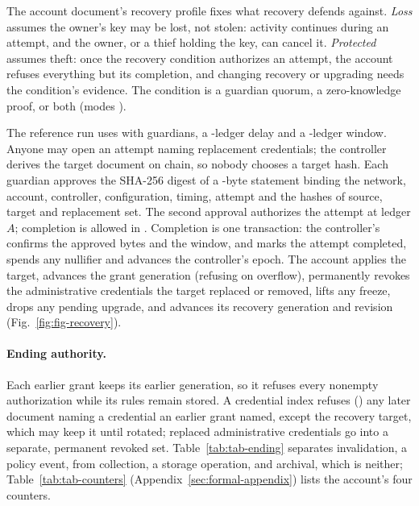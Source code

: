 The account document's recovery profile fixes what recovery defends against.
\emph{Loss} assumes the owner's key may be lost, not stolen: activity continues
during an attempt, and the owner, or a thief holding the key, can cancel it.
\emph{Protected} assumes theft: once the recovery condition authorizes an
attempt, the account refuses everything but its completion, and changing
recovery or upgrading needs the condition's evidence. The condition is
a guardian quorum, a zero-knowledge proof, or both (modes ).

The reference run uses  with
 guardians, a -ledger
delay and a -ledger window. Anyone may open an
attempt naming replacement credentials; the controller derives the target
document on chain, so nobody chooses a target hash. Each guardian approves the
SHA-256 digest of a -byte statement binding the
network, account, controller, configuration, timing, attempt and the hashes of
source, target and replacement set. The second approval authorizes the attempt
at ledger $A$; completion is allowed in . Completion is
one transaction: the controller's  confirms the approved bytes
and the window, and  marks the attempt completed, spends any
nullifier and advances the controller's epoch. The account applies the target,
advances the grant generation (refusing on overflow), permanently revokes the
administrative credentials the target replaced or removed, lifts any freeze,
drops any pending upgrade, and advances its recovery generation and revision
(Fig.~\ref{fig:fig-recovery}).


\paragraph{Ending authority.} Each earlier grant keeps its earlier generation, so
it refuses every nonempty authorization while its rules remain stored. A
credential index refuses () any later document naming a
credential an earlier grant named, except the recovery target, which may keep it
until rotated; replaced administrative credentials go into a separate, permanent
revoked set. Table~\ref{tab:tab-ending} separates invalidation, a policy event,
from collection, a storage operation, and archival, which is neither;
Table~\ref{tab:tab-counters} (Appendix~\ref{sec:formal-appendix}) lists the
account's four counters.



